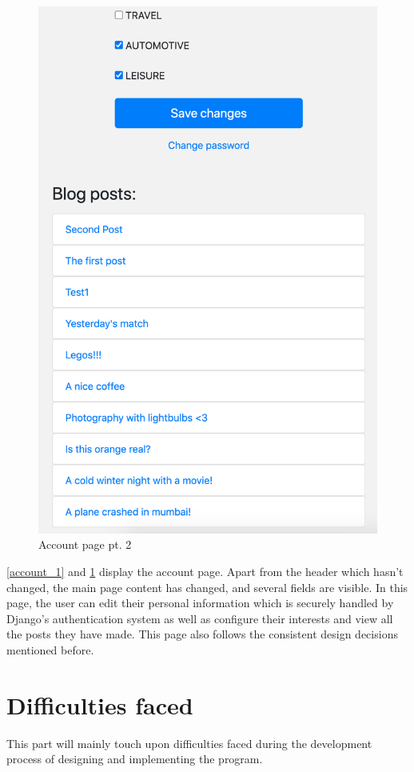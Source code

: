 \begin{figure}[htbp]
\begin{minipage}[t]{0.45\linewidth}
    \includegraphics[width=\linewidth]{Figures/account_2}
    \caption{Account page pt. 2}
    \label{account_2}
\end{minipage}
\end{figure}

\ref{account_1} and \ref{account_2} display the account page. Apart from the header which hasn't changed, the main page content has changed, and several fields are visible. In this page, the user can edit their personal information which is securely handled by Django's authentication system as well as configure their interests and view all the posts they have made. This page also follows the consistent design decisions mentioned before.


\section{Difficulties faced}
This part will mainly touch upon difficulties faced during the development process of designing and implementing the program.

